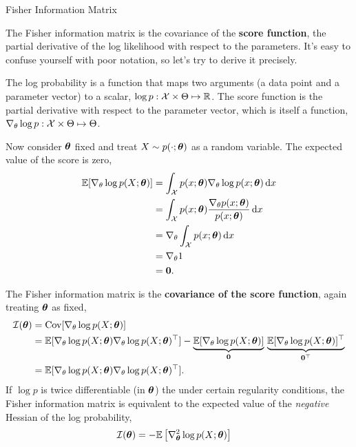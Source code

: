 \documentclass[aspectratio=169]{beamer}
\begin{document}
\begin{frame}[t,allowframebreaks]{Fisher Information
Matrix}\label{fisher-information-matrix}

The Fisher information matrix is the covariance of the \textbf{score
function}, the partial derivative of the log likelihood with respect to
the parameters. It's easy to confuse yourself with poor notation, so
let's try to derive it precisely.

The log probability is a function that maps two arguments (a data point
and a parameter vector) to a scalar,
\(\log p: \mathcal{X} \times \Theta \mapsto \mathbb{R}\). The score function is the
partial derivative with respect to the parameter vector, which is itself
a function, \(\nabla_\theta \log p: \mathcal{X} \times \Theta \mapsto \Theta\).

Now consider \(\boldsymbol{\theta}\) fixed and treat \(X \sim p(\cdot; \boldsymbol{\theta})\)
as a random variable. The expected value of the score is zero,
\begin{align*}
\mathbb{E}[\nabla_\theta \log p(X; \boldsymbol{\theta})] 
&= \int_{\mathcal{X}} p(x; \boldsymbol{\theta}) \nabla_\theta \log p (x; \boldsymbol{\theta}) \mathop{}\!\mathrm{d} x \\
&= \int_{\mathcal{X}} p(x; \boldsymbol{\theta}) \frac{\nabla_\theta p(x; \boldsymbol{\theta})}{p(x; \boldsymbol{\theta})} \mathop{}\!\mathrm{d} x \\
&= \nabla_\theta \int_{\mathcal{X}}  p(x; \boldsymbol{\theta}) \mathop{}\!\mathrm{d} x \\
&= \nabla_\theta 1 \\
&= \boldsymbol{0}.
\end{align*}

The Fisher information matrix is the \textbf{covariance of the score
function}, again treating \(\boldsymbol{\theta}\) as fixed, 
\begin{align*}
\mathcal{I}(\boldsymbol{\theta}) 
&= \textrm{Cov}[\nabla_\theta \log p(X; \boldsymbol{\theta})]  \\
&= \mathbb{E}[\nabla_\theta \log p(X; \boldsymbol{\theta}) \nabla_\theta \log p(X; \boldsymbol{\theta})^\top] 
- \underbrace{\mathbb{E}[\nabla_\theta \log p(X; \boldsymbol{\theta})]}_{\boldsymbol{0}} \, 
\underbrace{\mathbb{E}[\nabla_\theta \log p(X; \boldsymbol{\theta})]^\top}_{\boldsymbol{0}^\top} \\
&= \mathbb{E}[\nabla_\theta \log p(X; \boldsymbol{\theta}) \nabla_\theta \log p(X; \boldsymbol{\theta})^\top].
\end{align*} 
If \(\log p\) is twice differentiable (in \(\boldsymbol{\theta}\)) the
under certain regularity conditions, the Fisher information matrix is
equivalent to the expected value of the \emph{negative} Hessian of the
log probability, 
\begin{align*}
\mathcal{I}(\boldsymbol{\theta}) &= - \mathbb{E}\left[ \nabla_{\boldsymbol{\theta}}^2 \log p (X; \boldsymbol{\theta}) \right]
\end{align*}

\end{frame}
\end{document}
